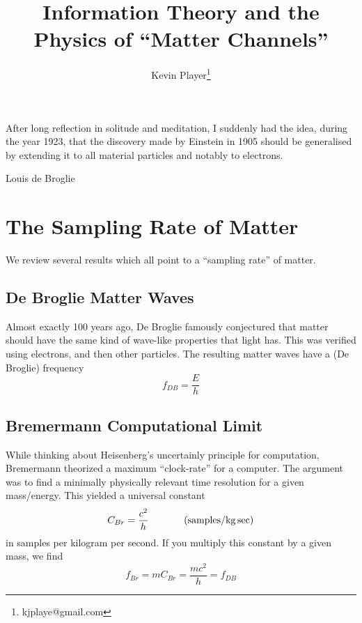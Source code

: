 \documentclass[12pt,a4paper]{article}
\begin{document}
\title{Information Theory and the Physics of ``Matter Channels''}
\author[1]{Kevin Player\footnote{kjplaye@gmail.com}}

\maketitle

\epigraph{After long reflection in solitude and meditation, I suddenly had the idea, during the year 1923, that the discovery made by Einstein in 1905 should be generalised by extending it to all material particles and notably to electrons.}{Louis de Broglie}


\section{The Sampling Rate of Matter}
\label{rate}
We review several results which all point to a ``sampling rate'' of matter.
\subsection{De Broglie Matter Waves}
Almost exactly 100 years ago, De Broglie famously conjectured that matter should have the same kind of wave-like properties that light has.  This was verified using electrons, and then other particles.  The resulting matter waves have a (De Broglie) frequency
\[
  f_{DB} = \frac{E}{h}
\]

\subsection{Bremermann Computational Limit}
While thinking about Heisenberg's uncertainly principle for computation, Bremermann theorized a maximum ``clock-rate'' for a computer.  The argument was to find a minimally physically relevant time resolution for a given mass/energy.  This yielded a universal constant
\[
  C_{Br} = \frac{c^2}{h} \hspace{0.5 in} (\si[per-mode=symbol]{samples\per\kilogram.\sec})
\]
in samples per kilogram per second.  If you multiply this constant by a given mass, we find
\[
 f_{Br} = m C_{Br} = \frac{mc^2}{h} = f_{DB}
\]
\end{document}
